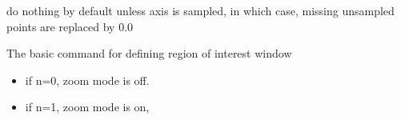 \documentclass[letterpaper,10pt,openany,oneside]{sphinxmanual}
\begin{document}
\begin{fulllineitems}
\begin{fulllineitems}
do nothing by default unless axis is sampled,
in which case, missing unsampled points are replaced by 0.0

\end{fulllineitems}


\begin{fulllineitems}
\label{rst/code:NPKData.NPKData.zoom}
The basic command for defining region of interest window
\begin{itemize}
\item {} 
if n=0, zoom mode is off.

\item {} 
if n=1, zoom mode is on,

\end{itemize}

\end{fulllineitems}


\end{fulllineitems}

\end{document}
